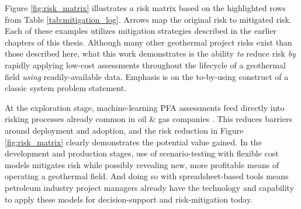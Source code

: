 Figure \ref{fig:risk_matrix} illustrates a risk matrix based on the highlighted rows from Table \ref{tab:mitigation_log}. Arrows map the original risk to mitigated risk. Each of these examples utilizes mitigation strategies described in the earlier chapters of this thesis. Although many other geothermal project risks exist than those described here, what this work demonstrates is the ability \textit{to} reduce risk \textit{by} rapidly applying low-cost assessments throughout the lifecycle of a geothermal field \textit{using} readily-available data. Emphasis is on the to-by-using construct of a classic system problem statement.

At the exploration stage, machine-learning PFA assessments feed directly into risking processes already common in oil \& gas companies \citep{nash_adaptation_2015}. This reduces barriers around deployment and adoption, and the risk reduction in Figure \ref{fig:risk_matrix} clearly demonstrates the potential value gained. In the development and production stages, use of scenario-testing with flexible cost models mitigates risk while possibly revealing new, more profitable means of operating a geothermal field. And doing so with spreadsheet-based tools means petroleum industry project managers already have the technology and capability to apply these models for decision-support and risk-mitigation today. 

